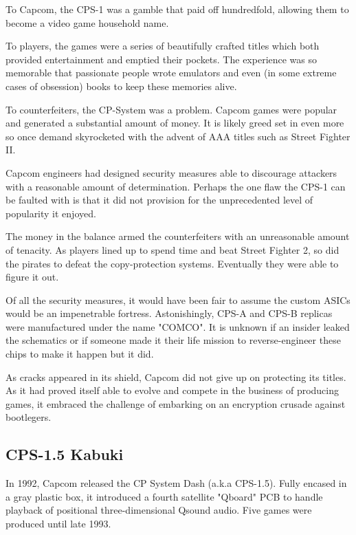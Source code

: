 To Capcom, the CPS-1 was a gamble that paid off hundredfold, allowing them to become a video game household name. 

To players, the games were a series of beautifully crafted titles which both provided entertainment and emptied their pockets. The experience was so memorable that passionate people wrote emulators and even (in some extreme cases of obsession) books to keep these memories alive. 

To counterfeiters, the CP-System was a problem. Capcom games were popular and generated a substantial amount of money. It is likely greed set in even more so once demand skyrocketed with the advent of AAA titles such as Street Fighter II. 

Capcom engineers had designed security measures able to discourage attackers with a reasonable amount of determination. Perhaps the one flaw the CPS-1 can be faulted with is that it did not provision for the unprecedented level of popularity it enjoyed.

The money in the balance armed the counterfeiters with an unreasonable amount of tenacity. As players lined up to spend time and beat Street Fighter 2, so did the pirates to defeat the copy-protection systems. Eventually they were able to figure it out. 


Of all the security measures, it would have been fair to assume the custom ASICs would be an impenetrable fortress. Astonishingly, CPS-A and CPS-B replicas were manufactured under the name "COMCO"\cite{arcadeHackerCPS1}. It is unknown if an insider leaked the schematics or if someone made it their life mission to reverse-engineer these chips to make it happen but it did.

As cracks appeared in its shield, Capcom did not give up on protecting its titles. As it had proved itself able to evolve and compete in the business of producing games, it embraced the challenge of embarking on an encryption crusade against bootlegers.

\subsection{CPS-1.5 Kabuki}
In 1992, Capcom released the CP System Dash (a.k.a CPS-1.5). Fully encased in a gray plastic box, it introduced a fourth satellite "Qboard" PCB to handle playback of positional three-dimensional Qsound audio. Five games were produced until late 1993.

